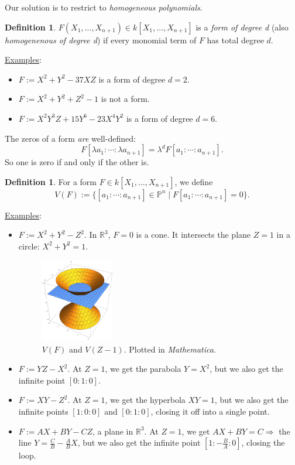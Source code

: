 \documentclass[12pt]{article}
\newcommand{\real}{\mathbb{R}}
\newcommand{\ita}[1]{\textit{#1}}
\theoremstyle{definition}
\newtheorem{definition}[theorem]{Definition}
\begin{document}
Our solution is to restrict to \ita{homogeneous polynomials}.
\begin{definition}
    $F(X_1,\dotsc,X_{n+1})\in k[X_1,\dotsc,X_{n+1}]$ is a \ita{form of degree d} (also \ita{homogenenous of degree d}) if every monomial term of $F$ has total degree $d$.
\end{definition}
\underline{Examples}:
\begin{itemize}
    \item $F:=X^2+Y^2-37XZ$ is a form of degree $d=2$.
    \item $F:=X^2+Y^2+Z^2-1$ is not a form.
    \item $F:=X^2Y^3Z+15Y^6-23X^4Y^2$ is a form of degree $d=6$.
\end{itemize}
The zeros of a form \ita{are} well-defined:
\[F[\lambda a_1:\cdots:\lambda a_{n+1}]=\lambda^dF[a_1:\cdots:a_{n+1}].\]
So one is zero if and only if the other is.
\begin{definition}
    For a form $F\in k[X_1,\dotsc,X_{n+1}]$, we define
    \begin{equation}
        V(F):=\{[a_1:\cdots:a_{n+1}]\in\mathbb{P}^n\mid F[a_1:\cdots:a_{n+1}]=0\}.
    \end{equation}
\end{definition}
\underline{Examples}:
\begin{itemize}
    \item $F:=X^2+Y^2-Z^2$. In $\real^3$, $F=0$ is a cone. It intersects the plane $Z=1$ in a circle: $X^2+Y^2=1$.
    \begin{figure}[H]
        \centering
        \includegraphics[width=0.3\textwidth]{26.pdf}
        \caption{$V(F)$ and $V(Z-1)$. Plotted in \ita{Mathematica}.}
    \end{figure}
    \item $F:=YZ-X^2$. At $Z=1$, we get the parabola $Y=X^2$, but we also get the infinite point $[0:1:0]$.
    \item $F:=XY-Z^2$. At $Z=1$, we get the hyperbola $XY=1$, but we also get the infinite points $[1:0:0]$ and $[0:1:0]$, closing it off into a single point. 
    \item $F:=AX+BY-CZ$, a plane in $\real^3$. At $Z=1$, we get $AX+BY=C\Rightarrow$ the line $Y=\frac{C}{B}-\frac{A}{B}X$, but we also get the infinite point $\left[1:-\frac{B}{A}:0\right]$, closing the loop.
\end{itemize}
\end{document}
